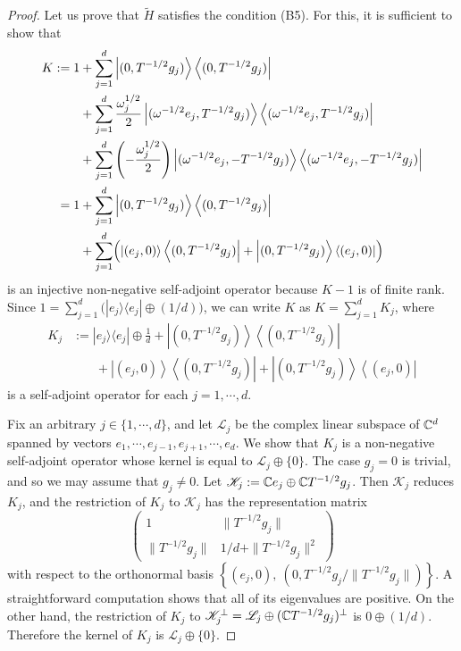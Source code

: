 \documentclass[12pt]{article}
\theoremstyle{plain}
\numberwithin{equation}{section}
\theoremstyle{remark}
\begin{document}
\begin{proof}
Let us prove that $\tilde{H}$ satisfies the condition (B5).
For this, it is sufficient to show that
\begin{align*}
K:=1&+\sum_{j=1}^d\left|(0,T^{-1/2}g_j)\right\rangle\left\langle (0,T^{-1/2}g_j)\right|\\
&+ \sum_{j=1}^d\frac{\omega_j^{1/2}}{2} 
\left|(\omega^{-1/2}e_j,T^{-1/2}g_j)\right\rangle\left\langle (\omega^{-1/2}e_j,T^{-1/2}g_j)\right|\\
&+ \sum_{j=1}^d\left(-\frac{\omega_j^{1/2}}{2}\right) 
\left|(\omega^{-1/2}e_j,-T^{-1/2}g_j)\right\rangle\left\langle (\omega^{-1/2}e_j,-T^{-1/2}g_j)\right|\\
=1&+ \sum_{j=1}^d\left|(0,T^{-1/2}g_j)\right\rangle\left\langle (0,T^{-1/2}g_j)\right|\\
&+\sum_{j=1}^d
\Bigl(\left|(e_j,0)\right\rangle\left\langle (0,T^{-1/2}g_j)\right|
+\left|(0,T^{-1/2}g_j)\right\rangle\left\langle (e_j,0)\right|\Bigr)
\end{align*}
is an injective non-negative self-adjoint operator because $K-1$ is of finite rank.
Since $1=\sum_{j=1}^d\big(|e_j\rangle\langle e_j|\oplus (1/d)\big)$, 
we can write $K$ as $K=\sum_{j=1}^{d}K_j$, where
\begin{align*}
K_j&:=|e_j\rangle\langle e_j|\oplus \frac{1}{d}+\left|(0,T^{-1/2}g_j)\right\rangle\left\langle(0,T^{-1/2}g_j)\right|\\
&\phantom{:=}\ +\left|(e_j,0)\right\rangle\left\langle (0,T^{-1/2}g_j)\right|
+\left|(0,T^{-1/2}g_j)\right\rangle\left\langle (e_j,0)\right|
\end{align*}
is a self-adjoint operator for each $j=1,\cdots,d$.

Fix an arbitrary $j\in\{1,\cdots,d\}$, and let $\mathscr{L}_j$ be the complex linear subspace of $\mathbb{C}^d$ spanned by vectors $e_1,\cdots,e_{j-1},e_{j+1},\cdots,e_d$.
We show that $K_j$ is a non-negative self-adjoint operator whose kernel is equal to $\mathscr{L}_j\oplus\{0\}$.
The case $g_j=0$ is trivial, and so we may assume that $g_j\not=0$.
Let $\mathscr{K}_j:=\mathbb{C} e_j\oplus\mathbb{C} T^{-1/2}g_j$.
Then $\mathscr{K}_j$ reduces $K_j$, and the restriction of $K_j$ to $\mathscr{K}_j$ has the representation matrix
\[
\begin{pmatrix}
1 & \|T^{-1/2}g_j\| \\
\|T^{-1/2}g_j\| & 1/d+\|T^{-1/2}g_j\|^2
\end{pmatrix}
\]
with respect to the orthonormal basis $\left\{(e_j,0),\ (0,T^{-1/2}g_j/\|T^{-1/2}g_j\|)\right\}$.
A straightforward computation shows that all of its eigenvalues are positive.
On the other hand, the restriction of $K_j$ to $\mathscr{K}_j^{\perp}=\mathscr{L}_j\oplus(\mathbb{C} T^{-1/2}g_j)^{\perp}$ is $0\oplus(1/d)$.
Therefore the kernel of $K_j$ is $\mathscr{L}_j\oplus\{0\}$.


\end{proof}
\end{document}
